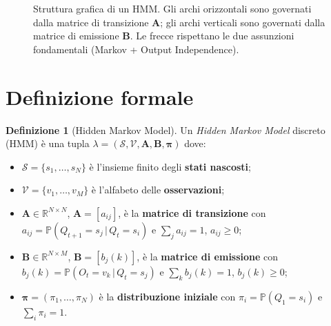 \documentclass[11pt,a4paper,oneside]{book}
\theoremstyle{plain}
\theoremstyle{definition}
\newtheorem{definizione}[teorema]{Definizione}
\theoremstyle{remark}
\newcommand{\R}{\mathbb{R}}
\newcommand{\Prob}{\mathbb{P}}
\newcommand{\states}{\mathcal{S}}            %
\newcommand{\obssym}{\mathcal{V}}            %
\newcommand{\Amat}{\mathbf{A}}               %
\newcommand{\Bmat}{\mathbf{B}}               %
\newcommand{\initvec}{\boldsymbol{\pi}}      %
\newcommand{\hmm}{\lambda}                   %
\newcommand{\Nstates}{N}                     %
\newcommand{\Msym}{M}                        %
\newcommand{\Tlen}{T}                        %
\newcommand{\given}{\,\vert\,}
\begin{document}
\begin{figure}[h!]
\centering
{}
\caption{Struttura grafica di un HMM. Gli archi orizzontali sono
governati dalla matrice di transizione $\Amat$; gli archi verticali
sono governati dalla matrice di emissione $\Bmat$. Le frecce rispettano
le due assunzioni fondamentali (Markov + Output Independence).}
\label{fig:hmm_trellis}
\end{figure}

\section{Definizione formale}

\begin{definizione}[Hidden Markov Model]
\label{def:hmm}
Un \emph{Hidden Markov Model} discreto (HMM) è una tupla
$\hmm = (\states, \obssym, \Amat, \Bmat, \initvec)$ dove:
\begin{itemize}[leftmargin=*]
    \item $\states=\{s_1,\dots,s_{\Nstates}\}$ è l'insieme finito degli
          \textbf{stati nascosti};
    \item $\obssym=\{v_1,\dots,v_{\Msym}\}$ è l'alfabeto delle
          \textbf{osservazioni};
    \item $\Amat\in\R^{\Nstates\times\Nstates}$, $\Amat=[a_{ij}]$, è
          la \textbf{matrice di transizione} con
          $a_{ij}=\Prob(Q_{t+1}=s_j\given Q_t=s_i)$ e
          $\sum_j a_{ij}=1$, $a_{ij}\ge 0$;
    \item $\Bmat\in\R^{\Nstates\times\Msym}$, $\Bmat=[b_j(k)]$, è la
          \textbf{matrice di emissione} con
          $b_j(k)=\Prob(O_t=v_k\given Q_t=s_j)$ e $\sum_k b_j(k)=1$,
          $b_j(k)\ge 0$;
    \item $\initvec=(\pi_1,\dots,\pi_{\Nstates})$ è la
          \textbf{distribuzione iniziale} con $\pi_i=\Prob(Q_1=s_i)$
          e $\sum_i \pi_i=1$.
\end{itemize}
\end{definizione}
\end{document}
